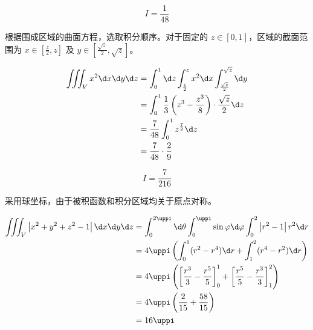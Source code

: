 \begin{solution}
    \begin{equation}
        I = \boxed{\frac{1}{48}}
    \end{equation}

    根据围成区域的曲面方程，选取积分顺序。对于固定的 $z \in [0, 1]$，区域的截面范围为 $x \in [\frac{z}{2}, z]$ 及 $y \in [\frac{\sqrt{z}}{2}, \sqrt{z}]$。

    \begin{equation}
        \begin{aligned}
            \iiint_{V} x^{2} \d x \d y \d z & = \int_{0}^{1} \d z \int_{\frac{z}{2}}^{z} x^2 \d x \int_{\frac{\sqrt{z}}{2}}^{\sqrt{z}} \d y \\
                                            & = \int_{0}^{1} \frac{1}{3} \left( z^3 - \frac{z^3}{8} \right) \cdot \frac{\sqrt{z}}{2} \d z   \\
                                            & = \frac{7}{48} \int_{0}^{1} z^{\frac{7}{2}} \d z                                              \\
                                            & = \frac{7}{48} \cdot \frac{2}{9} \label{eq:I5}
        \end{aligned}
    \end{equation}

    \begin{equation}
        I = \boxed{\frac{7}{216}}
    \end{equation}

    采用球坐标，由于被积函数和积分区域均关于原点对称。

    \begin{equation}
        \begin{aligned}
            \iiint_{V}\left|x^{2}+y^{2}+z^{2}-1\right| \d x \d y \d z & = \int_{0}^{2 \uppi} \d \theta \int_{0}^{\uppi} \sin \varphi \d \varphi \int_{0}^{2} \left| r^2 - 1 \right| r^2 \d r                 \\
                                                                      & = 4 \uppi \left( \int_{0}^{1} (r^2-r^4) \d r + \int_{1}^{2} (r^4-r^2) \d r \right)                                                   \\
                                                                      & = 4 \uppi \left( \left[ \frac{r^3}{3} - \frac{r^5}{5} \right]_{0}^{1} + \left[ \frac{r^5}{5} - \frac{r^3}{3} \right]_{1}^{2} \right) \\
                                                                      & = 4 \uppi \left( \frac{2}{15} + \frac{58}{15} \right)                                                                                \\
                                                                      & = 16 \uppi \label{eq:I6}
        \end{aligned}
    \end{equation}


\end{solution}
